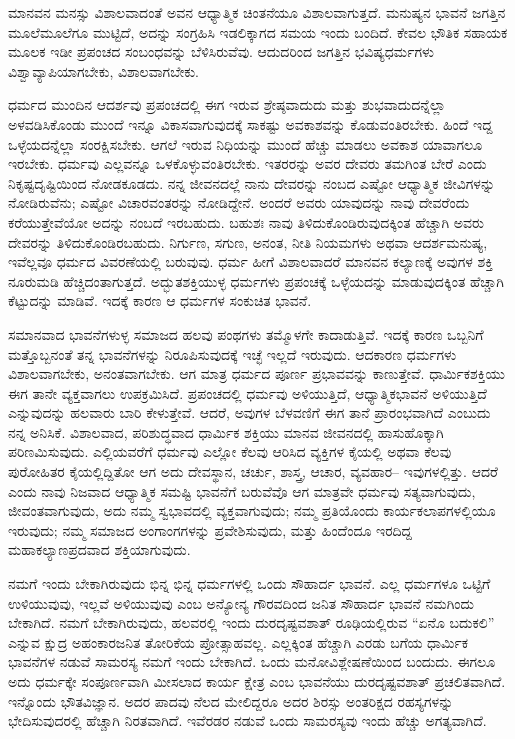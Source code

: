 ಮಾನವನ ಮನಸ್ಸು ವಿಶಾಲವಾದಂತೆ ಅವನ ಆಧ್ಯಾತ್ಮಿಕ ಚಿಂತನೆಯೂ ವಿಶಾಲವಾಗುತ್ತದೆ. ಮನುಷ್ಯನ ಭಾವನೆ ಜಗತ್ತಿನ ಮೂಲೆಮೂಲೆಗೂ ಮುಟ್ಟಿದೆ, ಅದನ್ನು ಸಂಗ್ರಹಿಸಿ ಇಡಲಿಕ್ಕಾಗದ ಸಮಯ ಇಂದು ಬಂದಿದೆ. ಕೇವಲ ಭೌತಿಕ ಸಹಾಯಕ ಮೂಲಕ ಇಡೀ ಪ್ರಪಂಚದ ಸಂಬಂಧವನ್ನು ಬೆಳಿಸಿರುವೆವು. ಆದುದರಿಂದ ಜಗತ್ತಿನ ಭವಿಷ್ಯಧರ್ಮಗಳು ವಿಶ್ವಾವ್ಯಾಪಿಯಾಗಬೇಕು, ವಿಶಾಲವಾಗಬೇಕು.

ಧರ್ಮದ ಮುಂದಿನ ಆದರ್ಶವು ಪ್ರಪಂಚದಲ್ಲಿ ಈಗ ಇರುವ ಶ್ರೇಷ್ಠವಾದುದು ಮತ್ತು ಶುಭವಾದುದನ್ನೆಲ್ಲಾ ಅಳವಡಿಸಿಕೊಂಡು ಮುಂದೆ ಇನ್ನೂ ವಿಕಾಸವಾಗುವುದಕ್ಕೆ ಸಾಕಷ್ಟು ಅವಕಾಶವನ್ನು ಕೊಡುವಂತಿರಬೇಕು. ಹಿಂದೆ ಇದ್ದ ಒಳ್ಳೆಯದನ್ನೆಲ್ಲಾ ಸಂರಕ್ಷಿಸಬೇಕು. ಆಗಲೆ ಇರುವ ನಿಧಿಯನ್ನು ಮುಂದೆ ಹೆಚ್ಚು ಮಾಡಲು ಅವಕಾಶ ಯಾವಾಗಲೂ ಇರಬೇಕು. ಧರ್ಮವು ಎಲ್ಲವನ್ನೂ ಒಳಕೊಳ್ಳುವಂತಿರಬೇಕು. ಇತರರನ್ನು ಅವರ ದೇವರು ತಮಗಿಂತ ಬೇರೆ ಎಂದು ನಿಕೃಷ್ಟದೃಷ್ಟಿಯಿಂದ ನೋಡಕೂಡದು. ನನ್ನ ಜೀವನದಲ್ಲೆ ನಾನು ದೇವರನ್ನು ನಂಬದ ಎಷ್ಟೋ ಆಧ್ಯಾತ್ಮಿಕ ಜೀವಿಗಳನ್ನು ನೋಡಿರುವೆನು; ಎಷ್ಟೋ ವಿಚಾರವಂತರನ್ನು ನೋಡಿದ್ದೇನೆ. ಅಂದರೆ ಅವರು ಯಾವುದನ್ನು ನಾವು ದೇವರೆಂದು ಕರೆಯುತ್ತೇವೆಯೋ ಅದನ್ನು ನಂಬದೆ ಇರಬಹುದು. ಬಹುಶಃ ನಾವು ತಿಳಿದುಕೊಂಡಿರುವುದಕ್ಕಿಂತ ಹೆಚ್ಚಾಗಿ ಅವರು ದೇವರನ್ನು ತಿಳಿದುಕೊಂಡಿರಬಹುದು. ನಿರ್ಗುಣ, ಸಗುಣ, ಅನಂತ, ನೀತಿ ನಿಯಮಗಳು ಅಥವಾ ಆದರ್ಶಮನುಷ್ಯ, ಇವೆಲ್ಲವೂ ಧರ್ಮದ ವಿವರಣೆಯಲ್ಲಿ ಬರುವುವು. ಧರ್ಮ ಹೀಗೆ ವಿಶಾಲವಾದರೆ ಮಾನವನ ಕಲ್ಯಾಣಕ್ಕೆ ಅವುಗಳ ಶಕ್ತಿ ನೂರುಮಡಿ ಹೆಚ್ಚಿದಂತಾಗುತ್ತದೆ. ಅದ್ಭುತಶಕ್ತಿಯುಳ್ಳ ಧರ್ಮಗಳು ಪ್ರಪಂಚಕ್ಕೆ ಒಳ್ಳೆಯದನ್ನು ಮಾಡುವುದಕ್ಕಿಂತ ಹೆಚ್ಚಾಗಿ ಕೆಟ್ಟುದನ್ನು ಮಾಡಿವೆ. ಇದಕ್ಕೆ ಕಾರಣ ಆ ಧರ್ಮಗಳ ಸಂಕುಚಿತ ಭಾವನೆ.

\vskip 0.2cm

ಸಮಾನವಾದ ಭಾವನೆಗಳುಳ್ಳ ಸಮಾಜದ ಹಲವು ಪಂಥಗಳು ತಮ್ಮೊಳಗೇ ಕಾದಾಡುತ್ತಿವೆ. ಇದಕ್ಕೆ ಕಾರಣ ಒಬ್ಬನಿಗೆ ಮತ್ತೊಬ್ಬನಂತೆ ತನ್ನ ಭಾವನೆಗಳನ್ನು ನಿರೂಪಿಸುವುದಕ್ಕೆ ಇಚ್ಛೆ ಇಲ್ಲದೆ ಇರುವುದು. ಆದಕಾರಣ ಧರ್ಮಗಳು ವಿಶಾಲವಾಗಬೇಕು, ಅನಂತವಾಗಬೇಕು. ಆಗ ಮಾತ್ರ ಧರ್ಮದ ಪೂರ್ಣ ಪ್ರಭಾವವನ್ನು ಕಾಣುತ್ತೇವೆ. ಧಾರ್ಮಿಕಶಕ್ತಿಯು ಈಗ ತಾನೇ ವ್ಯಕ್ತವಾಗಲು ಉಪಕ್ರಮಿಸಿದೆ. ಪ್ರಪಂಚದಲ್ಲಿ ಧರ್ಮವು ಅಳಿಯುತ್ತಿದೆ, ಆಧ್ಯಾತ್ಮಿಕಭಾವನೆ ಅಳಿಯುತ್ತಿದೆ ಎನ್ನುವುದನ್ನು ಹಲವಾರು ಬಾರಿ ಕೇಳುತ್ತೇವೆ. ಆದರೆ, ಅವುಗಳ ಬೆಳವಣಿಗೆ ಈಗ ತಾನೆ ಪ್ರಾರಂಭವಾಗಿದೆ ಎಂಬುದು ನನ್ನ ಅನಿಸಿಕೆ. ವಿಶಾಲವಾದ, ಪರಿಶುದ್ಧವಾದ ಧಾರ್ಮಿಕ ಶಕ್ತಿಯು ಮಾನವ ಜೀವನದಲ್ಲಿ ಹಾಸುಹೊಕ್ಕಾಗಿ ಪರಿಣಮಿಸುವುದು. ಎಲ್ಲಿಯವರೆಗೆ ಧರ್ಮವು ಎಲ್ಲೋ ಕೆಲವು ಆರಿಸಿದ ವ್ಯಕ್ತಿಗಳ ಕೈಯಲ್ಲಿ ಅಥವಾ ಕೆಲವು ಪುರೋಹಿತರ ಕೈಯಲ್ಲಿದ್ದಿತೋ ಆಗ ಅದು ದೇವಸ್ಥಾನ, ಚರ್ಚು, ಶಾಸ್ತ್ರ, ಆಚಾರ, ವ್ಯವಹಾರ– ಇವುಗಳಲ್ಲಿತ್ತು. ಆದರೆ ಎಂದು ನಾವು ನಿಜವಾದ ಆಧ್ಯಾತ್ಮಿಕ ಸಮಷ್ಟಿ ಭಾವನೆಗೆ ಬರುವೆವೊ ಆಗ ಮಾತ್ರವೇ ಧರ್ಮವು ಸತ್ಯವಾಗುವುದು, ಜೀವಂತವಾಗುವುದು, ಅದು ನಮ್ಮ ಸ್ವಭಾವದಲ್ಲಿ ವ್ಯಕ್ತವಾಗುವುದು; ನಮ್ಮ ಪ್ರತಿಯೊಂದು ಕಾರ್ಯಕಲಾಪಗಳಲ್ಲಿಯೂ ಇರುವುದು; ನಮ್ಮ ಸಮಾಜದ ಅಂಗಾಂಗಗಳನ್ನು ಪ್ರವೇಶಿಸುವುದು, ಮತ್ತು ಹಿಂದೆಂದೂ ಇರದಿದ್ದ ಮಹಾಕಲ್ಯಾಣಪ್ರದವಾದ ಶಕ್ತಿಯಾಗುವುದು.

ನಮಗೆ ಇಂದು ಬೇಕಾಗಿರುವುದು ಭಿನ್ನ ಭಿನ್ನ ಧರ್ಮಗಳಲ್ಲಿ ಒಂದು ಸೌಹಾರ್ದ ಭಾವನೆ. ಎಲ್ಲ ಧರ್ಮಗಳೂ ಒಟ್ಟಿಗೆ ಉಳಿಯುವುವು, ಇಲ್ಲವೆ ಅಳಿಯುವುವು ಎಂಬ ಅನ್ಯೋನ್ಯ ಗೌರವದಿಂದ ಜನಿತ ಸೌಹಾರ್ದ ಭಾವನೆ ನಮಗಿಂದು ಬೇಕಾಗಿದೆ. ನಮಗೆ ಬೇಕಾಗಿರುವುದು, ಹಲವರಲ್ಲಿ ಇಂದು ದುರದೃಷ್ಟವಶಾತ್​ ರೂಢಿಯಲ್ಲಿರುವ “ಏನೊ ಬದುಕಲಿ” ಎನ್ನುವ ಕ್ಷುದ್ರ ಅಹಂಕಾರಜನಿತ ತೋರಿಕೆಯ ಪ್ರೋತ್ಸಾಹವಲ್ಲ. ಎಲ್ಲಕ್ಕಿಂತ ಹೆಚ್ಚಾಗಿ ಎರಡು ಬಗೆಯ ಧಾರ್ಮಿಕ ಭಾವನೆಗಳ ನಡುವೆ ಸಾಮರಸ್ಯ ನಮಗೆ ಇಂದು ಬೇಕಾಗಿದೆ. ಒಂದು ಮನೋವಿಶ್ಲೇಷಣೆಯಿಂದ ಬಂದುದು. ಈಗಲೂ ಅದು ಧರ್ಮಕ್ಕೇ ಸಂಪೂರ್ಣವಾಗಿ ಮೀಸಲಾದ ಕಾರ್ಯ ಕ್ಷೇತ್ರ ಎಂಬ ಭಾವನೆಯು ದುರದೃಷ್ಟವಶಾತ್​ ಪ್ರಚಲಿತವಾಗಿದೆ. ಇನ್ನೊಂದು ಭೌತವಿಜ್ಞಾನ. ಅದರ ಪಾದವು ನೆಲದ ಮೇಲಿದ್ದರೂ ಅದರ ಶಿರಸ್ಸು ಅಂತರಿಕ್ಷದ ರಹಸ್ಯಗಳನ್ನು ಭೇದಿಸುವುದರಲ್ಲಿ ಹೆಚ್ಚಾಗಿ ನಿರತವಾಗಿದೆ. ಇವೆರಡರ ನಡುವೆ ಒಂದು ಸಾಮರಸ್ಯವು ಇಂದು ಹೆಚ್ಚು ಅಗತ್ಯವಾಗಿದೆ.

